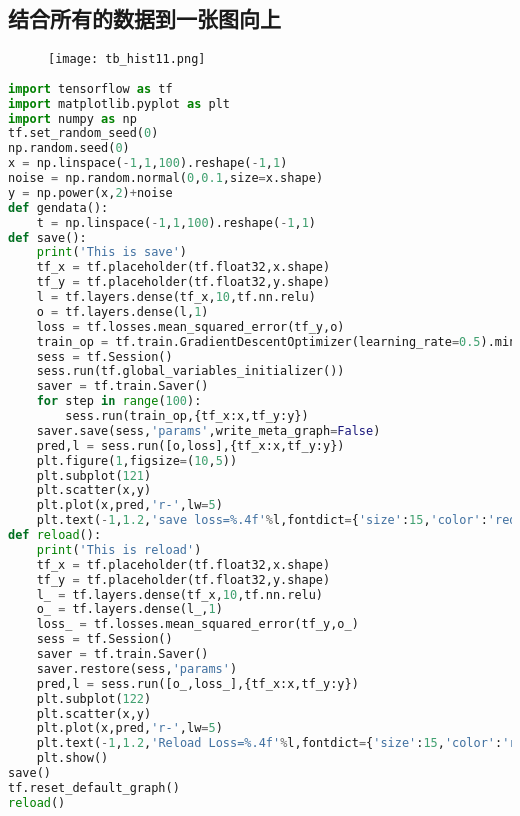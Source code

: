 \subsection{结合所有的数据到一张图向上}
\begin{center}
\begin{figure}[H]
\texttt{[image: tb\_hist11.png]}
\end{figure}
\end{center}


\begin{lstlisting}[language=Python]
import tensorflow as tf
import matplotlib.pyplot as plt
import numpy as np
tf.set_random_seed(0)
np.random.seed(0)
x = np.linspace(-1,1,100).reshape(-1,1)
noise = np.random.normal(0,0.1,size=x.shape)
y = np.power(x,2)+noise
def gendata():
    t = np.linspace(-1,1,100).reshape(-1,1)
def save():
    print('This is save')
    tf_x = tf.placeholder(tf.float32,x.shape)
    tf_y = tf.placeholder(tf.float32,y.shape)
    l = tf.layers.dense(tf_x,10,tf.nn.relu)
    o = tf.layers.dense(l,1)
    loss = tf.losses.mean_squared_error(tf_y,o)
    train_op = tf.train.GradientDescentOptimizer(learning_rate=0.5).minimize(loss)
    sess = tf.Session()
    sess.run(tf.global_variables_initializer())
    saver = tf.train.Saver()
    for step in range(100):
        sess.run(train_op,{tf_x:x,tf_y:y})
    saver.save(sess,'params',write_meta_graph=False)
    pred,l = sess.run([o,loss],{tf_x:x,tf_y:y})
    plt.figure(1,figsize=(10,5))
    plt.subplot(121)
    plt.scatter(x,y)
    plt.plot(x,pred,'r-',lw=5)
    plt.text(-1,1.2,'save loss=%.4f'%l,fontdict={'size':15,'color':'red'})
def reload():
    print('This is reload')
    tf_x = tf.placeholder(tf.float32,x.shape)
    tf_y = tf.placeholder(tf.float32,y.shape)
    l_ = tf.layers.dense(tf_x,10,tf.nn.relu)
    o_ = tf.layers.dense(l_,1)
    loss_ = tf.losses.mean_squared_error(tf_y,o_)
    sess = tf.Session()
    saver = tf.train.Saver()
    saver.restore(sess,'params')
    pred,l = sess.run([o_,loss_],{tf_x:x,tf_y:y})
    plt.subplot(122)
    plt.scatter(x,y)
    plt.plot(x,pred,'r-',lw=5)
    plt.text(-1,1.2,'Reload Loss=%.4f'%l,fontdict={'size':15,'color':'red'})
    plt.show()
save()
tf.reset_default_graph()
reload()
\end{lstlisting}
